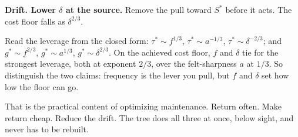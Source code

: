 \documentclass[12pt]{article}
\begin{document}
\textbf{Drift. Lower $\delta$ at the source.} Remove the pull toward $S^*$ before it acts. The cost floor falls as $\delta^{2/3}$.

Read the leverage from the closed form: $\tau^*\sim f^{1/3}$, $\tau^*\sim a^{-1/3}$, $\tau^*\sim\delta^{-2/3}$; and $g^*\sim f^{2/3}$, $g^*\sim a^{1/3}$, $g^*\sim\delta^{2/3}$. On the achieved cost floor, $f$ and $\delta$ tie for the strongest leverage, both at exponent $2/3$, over the felt-sharpness $a$ at $1/3$. So distinguish the two claims: frequency is the lever you pull, but $f$ and $\delta$ set how low the floor can go.

That is the practical content of optimizing maintenance. Return often. Make return cheap. Reduce the drift. The tree does all three at once, below sight, and never has to be rebuilt.
\end{document}
